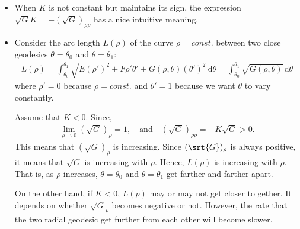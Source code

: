 \documentclass[10pt]{article}
\newcommand{\dee}{\mathrm{d}}
\newcommand{\ra}{\rightarrow}
\begin{document}
\begin{itemize}
    \item When $K$ is not constant but maintains its sign, the expression $\sqrt{G} K = - (\sqrt{G})_{\rho\rho}$ has a nice intuitive meaning.

    \item Consider the arc length $L(\rho)$ of the curve $\rho = const.$ between two close geodesics $\theta = \theta_0$ and $\theta = \theta_1$:
    \begin{align*}
      L(\rho) = \int_{\theta_0}^{\theta_1} \sqrt{E (\rho')^2 + F\rho' \theta' + G(\rho,\theta) (\theta')^2}\, \dee \theta
      = \int_{\theta_0}^{\theta_1} \sqrt{G(\rho,\theta)}\, \dee\theta
    \end{align*}
    where $\rho' = 0$ because $\rho = const.$ and $\theta' = 1$ because we want $\theta$ to vary constantly.

    Assume that $K < 0$. Since,
    \begin{align*}
      \lim_{\rho \ra 0} (\sqrt{G})_\rho = 1, \quad \mbox{and} \quad (\sqrt{G})_{\rho\rho} = -K \sqrt{G} > 0.
    \end{align*}
    This means that $(\sqrt{G})_\rho$ is increasing. Since $(\srt{G})_\rho$ is always positive, it means that $\sqrt{G}$ is increasing with $\rho$. Hence, $L(\rho)$ is increasing with $\rho$. That is, as $\rho$ increases, $\theta = \theta_0$ and $\theta = \theta_1$ get farther and farther apart.

    On the other hand, if $K < 0$, $L(p)$ may or may not get closer to gether. It depends on whether $\sqrt{G}_\rho$ becomes negative or not. However, the rate that the two radial geodesic get further from each other will become slower.
  \end{itemize}  
\end{document}
